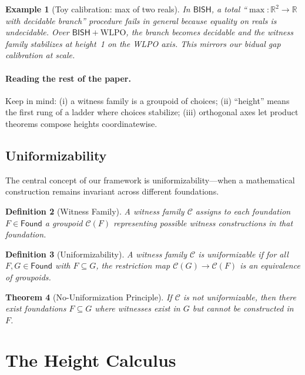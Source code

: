 \documentclass[11pt]{article}
\newtheorem{theorem}{Theorem}[section]
\newtheorem{definition}[theorem]{Definition}
\newtheorem{example}[theorem]{Example}
\newcommand{\R}{\mathbb{R}}
\newcommand{\WLPO}{\mathrm{WLPO}}
\newcommand{\BISH}{\mathsf{BISH}}
\newcommand{\Found}{\mathsf{Found}}
\begin{document}
\begin{example}[Toy calibration: max of two reals]
In $\BISH$, a total ``$\max:\R^2\to\R$ with decidable branch'' procedure fails in general because equality on reals is undecidable. Over $\BISH+\WLPO$, the branch becomes decidable and the witness family stabilizes at height~1 on the WLPO axis. This mirrors our bidual gap calibration at scale.
\end{example}

\paragraph{Reading the rest of the paper.}
Keep in mind: (i) a witness family is a groupoid of choices; (ii) ``height'' means the first rung of a ladder where choices stabilize; (iii) orthogonal axes let product theorems compose heights coordinatewise.

\subsection{Uniformizability}

The central concept of our framework is uniformizability—when a mathematical construction remains invariant across different foundations.

\begin{definition}[Witness Family]
A \emph{witness family} $\mathcal{C}$ assigns to each foundation $F \in \Found$ a groupoid $\mathcal{C}(F)$ representing possible witness constructions in that foundation.
\end{definition}

\begin{definition}[Uniformizability]
A witness family $\mathcal{C}$ is \emph{uniformizable} if for all $F, G \in \Found$ with $F \subseteq G$, the restriction map $\mathcal{C}(G) \to \mathcal{C}(F)$ is an equivalence of groupoids.
\end{definition}

\begin{theorem}[No-Uniformization Principle]\label{thm:no-unif}
If $\mathcal{C}$ is not uniformizable, then there exist foundations $F \subseteq G$ where witnesses exist in $G$ but cannot be constructed in $F$.
\end{theorem}

\section{The Height Calculus}
\end{document}
